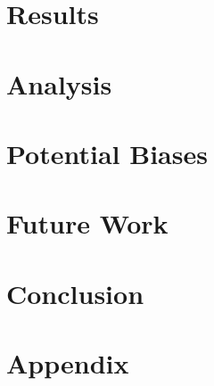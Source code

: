 \documentclass[11pt]{article}
\begin{document}
	\section{Results}\label{sec:results}
	\section{Analysis}\label{sec:analysis}
	\section{Potential Biases}\label{sec:biases}
	\section{Future Work}\label{sec:future}
	\section{Conclusion}\label{sec:conclusion}
	\section{Appendix}\label{sec:appendix}
	
	
\end{document}
